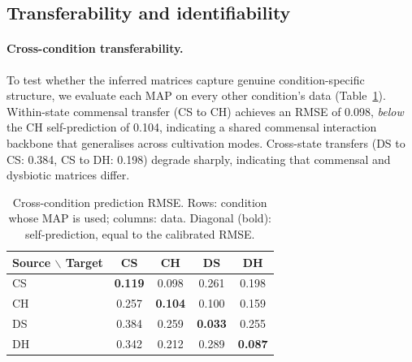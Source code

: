 \documentclass[pdflatex,sn-mathphys-num,lineno]{sn-jnl}
\begin{document}
% 
% 


\subsection{Transferability and identifiability}
\label{sec:sensitivity}

\paragraph{Cross-condition transferability.}
To test whether the inferred matrices capture genuine condition-specific structure, we evaluate each MAP on every other condition's data (Table~\ref{tab:cross_prediction}).
Within-state commensal transfer (CS to CH) achieves an RMSE of 0.098, \emph{below} the CH self-prediction of 0.104, indicating a shared commensal interaction backbone that generalises across cultivation modes.
Cross-state transfers (DS to CS: 0.384, CS to DH: 0.198) degrade sharply, indicating that commensal and dysbiotic matrices differ.

\begin{table}[htbp]
\centering\small
\begin{tabular}{@{}lcccc@{}}
\toprule
Source $\backslash$ Target & CS & CH & DS & DH \\
\midrule
CS & \textbf{0.119} & 0.098 & 0.261 & 0.198 \\
CH & 0.257 & \textbf{0.104} & 0.100 & 0.159 \\
DS & 0.384 & 0.259 & \textbf{0.033} & 0.255 \\
DH & 0.342 & 0.212 & 0.289 & \textbf{0.087} \\
\bottomrule
\end{tabular}
\caption{Cross-condition prediction RMSE. Rows: condition whose MAP is used; columns: data. Diagonal (bold): self-prediction, equal to the calibrated RMSE.}
\label{tab:cross_prediction}
\end{table}
\end{document}
